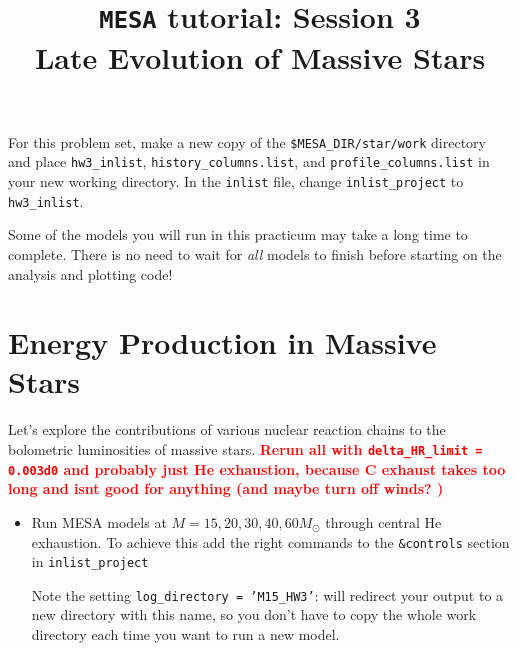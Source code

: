 \documentclass[11pt,a4paper]{article}
\newcommand{\todo}[1]{\textbf{\textcolor{red}{#1}}}
\begin{document}
\title{
    \textbf{\texttt{MESA} tutorial:  Session 3} \\
    \textbf{\Large Late Evolution of Massive Stars}
}
\date{}
\maketitle
\vspace{-1cm}


For this problem set, make a new copy of the \texttt{\$MESA\_DIR/star/work} 
directory and place \texttt{hw3\_inlist}, \texttt{history\_columns.list}, and \texttt{profile\_columns.list} in your new working directory.
In the \texttt{inlist} file, change \texttt{inlist\_project} to \texttt{hw3\_inlist}.


\begin{tcolorbox}[protipbox]
Some of the models you will run in this practicum may take a long time to complete.
There is no need to wait for \textit{all} models to finish before starting on the analysis and plotting code!
\end{tcolorbox}

\section{Energy Production in Massive Stars}

Let's explore the contributions of various nuclear reaction chains to the bolometric luminosities of massive stars.
\todo{Rerun all with \texttt{delta\_HR\_limit = 0.003d0} and probably just He exhaustion, because C exhaust takes too long and isnt good for anything 
(and maybe turn off winds? )}

\begin{itemize}
    \item Run MESA models at $M = 15, 20, 30, 40, 60 M_\odot$ through central He exhaustion.
    To achieve this add the right commands to the \texttt{\&controls} section in \texttt{inlist\_project}
    
    Note the setting \texttt{log\_directory = 'M15\_HW3'}: will redirect your output to a new directory with this name, so you don't have to copy the whole work directory each time you want to run a new model.
    
\end{itemize}
\end{document}
